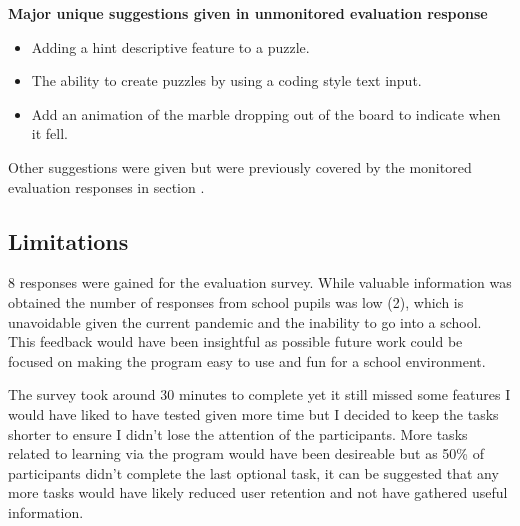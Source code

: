 \documentclass{l4proj}
\begin{document}
\textbf{Major unique suggestions given in unmonitored evaluation response}
\begin{itemize}
    \item Adding a hint descriptive feature to a puzzle.
    \item The ability to create puzzles by using a coding style text input.
    \item Add an animation of the marble dropping out of the board to indicate when it fell.
\end{itemize}


Other suggestions were given but were previously covered by the monitored evaluation responses in section .

\subsection{Limitations}

8 responses were gained for the evaluation survey. While valuable information was obtained the number of responses from school pupils was low (2), which is unavoidable given the current pandemic and the inability to go into a school. This feedback would have been insightful as possible future work could be focused on making the program easy to use and fun for a school environment. 

The survey took around 30 minutes to complete yet it still missed some features I would have liked to have tested given more time but I decided to keep the tasks shorter to ensure I didn't lose the attention of the participants. More tasks related to learning via the program would have been desireable but as 50\% of participants didn't complete the last optional task, it can be suggested that any more tasks would have likely reduced user retention and not have gathered useful information.
\end{document}
